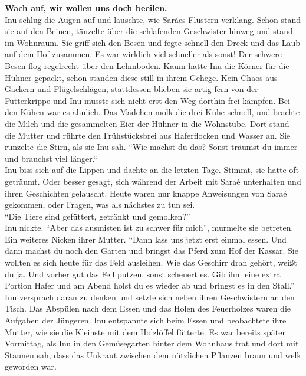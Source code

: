 \textbf{Wach auf, wir wollen uns doch beeilen.} \\
Inu schlug die Augen auf und lauschte, wie Saráes Flüstern verklang. Schon stand sie auf den 
Beinen, tänzelte über die schlafenden Geschwister hinweg und stand im Wohnraum. Sie griff sich den 
Besen und fegte schnell den Dreck und das Laub auf dem Hof zusammen. Es war wirklich viel schneller 
als sonst! Der schwere Besen flog regelrecht über den Lehmboden. Kaum hatte Inu die Körner für die 
Hühner gepackt, schon standen diese still in ihrem Gehege. Kein Chaos aus Gackern und 
Flügelschlägen, stattdessen blieben sie artig fern von der Futterkrippe und Inu musste sich nicht 
erst den Weg dorthin frei kämpfen. Bei den Kühen war es ähnlich. Das Mädchen molk die drei Kühe 
schnell, und brachte die Milch und die gesammelten Eier der Hühner in die Wohnstube. Dort stand die 
Mutter und rührte den Frühstücksbrei aus Haferflocken und Wasser an. Sie runzelte die Stirn, als 
sie Inu sah. 
``Wie machst du das? Sonst träumst du immer und brauchst viel länger.``\\
Inu biss sich auf die Lippen und dachte an die letzten Tage. Stimmt, sie hatte oft geträumt. Oder 
besser gesagt, sich während der Arbeit mit Saraé unterhalten und ihren Geschichten gelauscht. Heute 
waren nur knappe Anweisungen von Saraé gekommen, oder Fragen, was als nächstes zu tun sei.\\
``Die Tiere sind gefüttert, getränkt und gemolken?''\\
Inu nickte. ``Aber das ausmisten ist zu schwer für mich'', murmelte sie betreten. \\
Ein weiteres Nicken ihrer Mutter. ``Dann lass uns jetzt erst einmal essen. Und dann machst du noch 
den Garten und bringst das Pferd zum Hof der Kassar. Sie wollten es sich heute für das Feld 
ausleihen. Wie das Geschirr dran gehört, weißt du ja. Und vorher gut das Fell putzen, sonst 
scheuert es. Gib ihm eine extra Portion Hafer und am Abend holst du es wieder ab und bringst es in 
den Stall.''\\
Inu versprach daran zu denken und setzte sich neben ihren Geschwistern an den Tisch. Das Abspülen 
nach dem Essen und das Holen des Feuerholzes waren die Aufgaben der Jüngeren. Inu entspannte sich 
beim Essen und beobachtete ihre Mutter, wie sie die Kleinste mit dem Holzlöffel fütterte. 
Es war bereits später Vormittag, als Inu in den Gemüsegarten hinter dem Wohnhaus trat und dort mit 
Staunen sah, dass das Unkraut zwischen dem nützlichen Pflanzen braun und welk geworden war. \\
